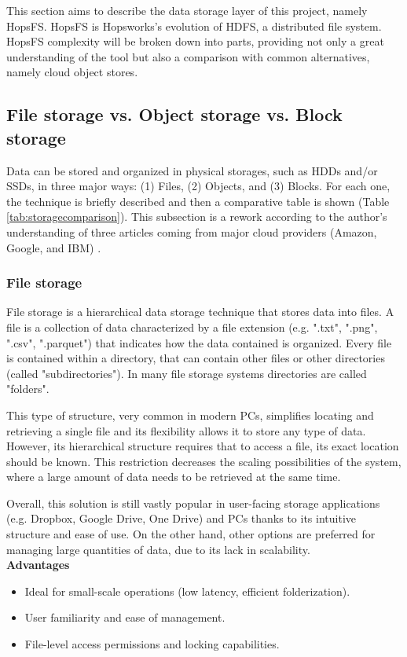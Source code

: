 This section aims to describe the data storage layer of this project, namely \gls{HopsFS}. \gls{HopsFS} is Hopsworks's evolution of \gls{HDFS}, a distributed file system. \gls{HopsFS} complexity will be broken down into parts, providing not only a great understanding of the tool but also a comparison with common alternatives, namely cloud object stores.

\subsection{File storage vs. Object storage vs. Block storage}

Data can be stored and organized in physical storages, such as \glspl{HDD} and/or \glspl{SSD}, in three major ways: (1) Files, (2) Objects, and (3) Blocks. For each one, the technique is briefly described and then a comparative table is shown (Table \ref{tab:storagecomparison}). This subsection is a rework according to the author's understanding of three articles coming from major cloud providers (Amazon, Google, and IBM) \cite{BlockVsFile, HowObjectVs, ObjectVsFile2021}.

\subsubsection*{File storage}

File storage is a hierarchical data storage technique that stores data into files. A file is a collection of data characterized by a file extension (e.g. ".txt", ".png", ".csv", ".parquet") that indicates how the data contained is organized. Every file is contained within a directory, that can contain other files or other directories (called "subdirectories"). In many file storage systems directories are called "folders". 

This type of structure, very common in modern \glspl{PC}, simplifies locating and retrieving a single file and its flexibility allows it to store any type of data. However, its hierarchical structure requires that to access a file, its exact location should be known. This restriction decreases the scaling possibilities of the system, where a large amount of data needs to be retrieved at the same time.

Overall, this solution is still vastly popular in user-facing storage applications (e.g. Dropbox, Google Drive, One Drive) and \glspl{PC} thanks to its intuitive structure and ease of use. On the other hand, other options are preferred for managing large quantities of data, due to its lack in scalability. \\[3mm]
\noindent\textbf{Advantages}
\begin{itemize}
    \item Ideal for small-scale operations (low latency, efficient folderization).
    \item User familiarity and ease of management.
    \item File-level access permissions and locking capabilities.
\end{itemize}


